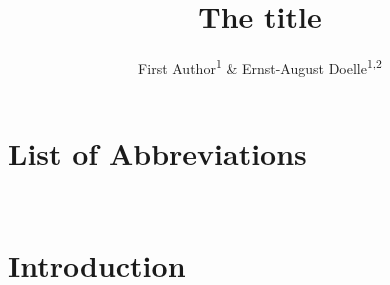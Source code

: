 \documentclass[
  stu, a4paper,floatsintext]{apa7}
\title{The title}
\author{First Author\textsuperscript{1} \& Ernst-August Doelle\textsuperscript{1,2}}
\date{}
\affiliation{\vspace{0.5cm}\textsuperscript{1} Wilhelm-Wundt-University\\\textsuperscript{2} Konstanz Business School}
\begin{document}
\maketitle

{
\setcounter{tocdepth}{3}
\tableofcontents
}
\newpage
\section*{List of Abbreviations}

\footnotesize
\setlength{\parindent}{0pt}
\begin{minipage}[t]{0.45\textwidth}

\vspace{1ex}
\begin{tabular}{@{}p{4em}p{}@{}}

\end{tabular}
\end{minipage}
\hfill
\begin{minipage}[t]{0.45\textwidth}

\vspace{1ex}
\begin{tabular}{@{}p{4em}p{}@{}}

\end{tabular}
\end{minipage}

\newpage

\section{Introduction}\label{introduction}
\end{document}

